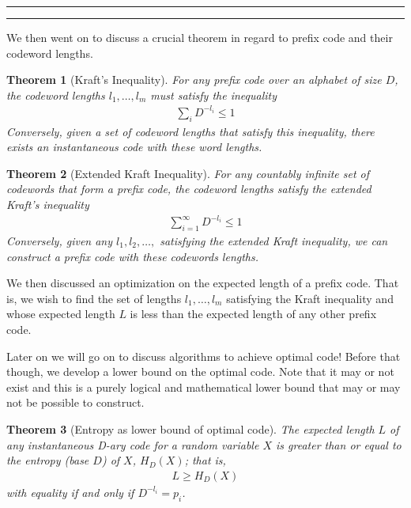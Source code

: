 \documentclass{article}
\newtheorem{theorem}{Theorem}
\newcounter{questionCounter}
\newcounter{partCounter}[questionCounter]
\newenvironment{question}[2][\arabic{questionCounter}]{%
    \setcounter{partCounter}{0}%
    \vspace{.25in} \hrule \vspace{0.5em}%
        \noindent{\bf \large#2}%
    \vspace{0.5em} \hrule \vspace{.10in}%
    \addtocounter{questionCounter}{1}%
}{}
\begin{document}
\begin{question}{Main Theorems/Ideas in the lecture}
    We then went on to discuss a crucial theorem in regard to prefix code and their codeword lengths.

    \begin{theorem}[Kraft's Inequality] For any prefix code over an alphabet of size $D$, the codeword lengths $l_1, \ldots, l_m$ must satisfy the inequality 
    \begin{gather*}
        \sum_i D^{-l_i} \leq 1
    \end{gather*}
    Conversely, given a set of codeword lengths that satisfy this inequality, there exists an instantaneous code with these word lengths.
    
    \end{theorem}

    \begin{theorem}[Extended Kraft Inequality] For any countably infinite set of codewords that form a prefix code, the codeword lengths satisfy the extended Kraft’s inequality 
    \begin{gather*}
        \sum_{i=1}^\infty D^{-l_i} \leq 1
    \end{gather*}
    Conversely, given any $l_1, l_2, \ldots,$ satisfying the extended Kraft inequality, we can construct a prefix code with these
codewords lengths.
\end{theorem}

We then discussed an optimization on the expected length of a prefix code. That is, we wish to find the set of lengths $l_1, \ldots, l_m$ satisfying the Kraft inequality and whose expected length $L$ is less than the expected length of any other prefix code.

Later on we will go on to discuss algorithms to achieve optimal code! Before that though, we develop a lower bound on the optimal code. Note that it may or not exist and this is a purely logical and mathematical lower bound that may or may not be possible to construct.

\begin{theorem}[Entropy as lower bound of optimal code] The expected length $L$ of any instantaneous D-ary code for a random variable $X$ is greater than or equal to the entropy (base $D$) of $X$, $H_D(X)$; that is,
\begin{gather*}
    L \geq H_D(X)
\end{gather*}
with equality if and only if $D^{-l_i} = p_i$.
    
\end{theorem}

\vspace{5cm}

\end{question}
\end{document}
